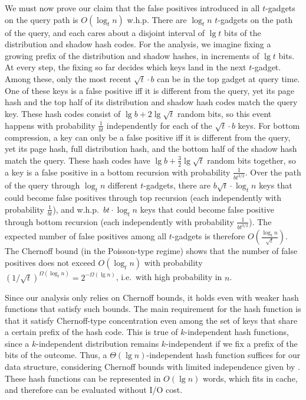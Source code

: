 \documentclass[letterpaper,11pt]{article}
\begin{document}
We must now prove our claim that the false positives introduced in all
$t$-gadgets on the query path is $O(\log_t n)$ w.h.p. There are
$\log_t n$ $t$-gadgets on the path of the query, and each cares about
a disjoint interval of $\lg t$ bits of the distribution and shadow
hash codes. For the analysis, we imagine fixing a growing prefix of
the distribution and shadow hashes, in increments of $\lg t$ bits. At
every step, the fixing so far decides which keys land in the next
$t$-gadget. Among these, only the most recent $\sqrt{t} \cdot b$ can
be in the top gadget at query time. One of these keys is a false
positive iff it is different from the query, yet its page hash and the
top half of its distribution and shadow hash codes match the query
key. These hash codes consist of $\lg b + 2\lg \sqrt{t}$ random bits,
so this event happens with probability $\frac{1}{bt}$ independently
for each of the $\sqrt{t} \cdot b$ keys. For bottom compression, a key
can only be a false positive iff it is different from the query, yet
its page hash, full distribution hash, and the bottom half of the
shadow hash match the query. These hash codes have $\lg b +
\frac{3}{2} \lg \sqrt{t}$ random bits together, so a key is a false
positive in a bottom recursion with probability $\frac{1}{b
  t^{3/2}}$. Over the path of the query through $\log_t n$ different
$t$-gadgets, there are $b\sqrt{t} \cdot \log_t n$ keys that could
become false positives through top recursion (each independently with
probability $\frac{1}{bt}$), and w.h.p.~$bt \cdot \log_t n$ keys that
could become false positive through bottom recursion (each
independently with probability $\frac{1}{b t^{3/2}}$). The expected
number of false positives among all $t$-gadgets is therefore
$O(\frac{\log_t n}{\sqrt{t}})$. The Chernoff bound (in the
Poisson-type regime) shows that the number of false positives does not
exceed $O(\log_t n)$ with probability $(1/\sqrt{t})^{\Omega(\log_t n)}
= 2^{-\Omega(\lg n)}$, i.e.~with high probability in $n$.

Since our analysis only relies on Chernoff bounds, it holds even with
weaker hash functions that satisfy such bounds. The main requirement
for the hash function is that it satisfy Chernoff-type concentration
even among the set of keys that share a certain prefix of the hash
code. This is true of $k$-independent hash functions, since a
$k$-independent distribution remains $k$-independent if we fix a
prefix of the bits of the outcome. Thus, a $\Theta(\lg n)$-independent
hash function suffices for our data structure, considering Chernoff
bounds with limited independence given by \cite{schmidt95chernoff}.
These hash functions can be represented in $O(\lg n)$ words, which
fits in cache, and therefore can be evaluated without I/O cost.
\end{document}
